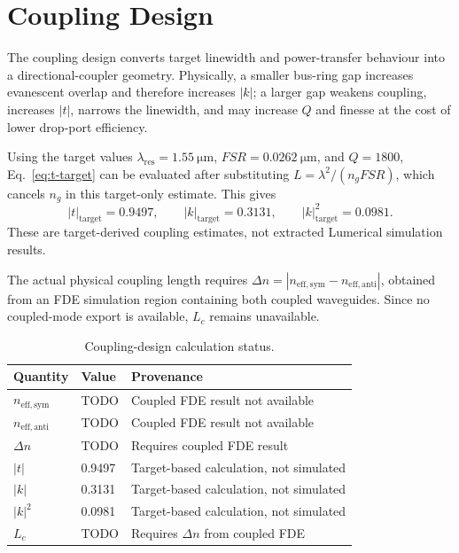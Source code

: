\section{Coupling Design}
The coupling design converts target linewidth and power-transfer behaviour into a directional-coupler geometry. Physically, a smaller bus-ring gap increases evanescent overlap and therefore increases \(|k|\); a larger gap weakens coupling, increases \(|t|\), narrows the linewidth, and may increase \(Q\) and finesse at the cost of lower drop-port efficiency.

Using the target values \(\lambda_{\mathrm{res}}=\SI{1.55}{\micro\metre}\), \(FSR=\SI{0.0262}{\micro\metre}\), and \(Q=1800\), Eq.~\eqref{eq:t-target} can be evaluated after substituting \(L=\lambda^2/(n_g FSR)\), which cancels \(n_g\) in this target-only estimate. This gives
\begin{equation}
|t|_{\mathrm{target}} = 0.9497,\qquad
|k|_{\mathrm{target}} = 0.3131,\qquad
|k|_{\mathrm{target}}^2 = 0.0981.
\end{equation}
These are target-derived coupling estimates, not extracted Lumerical simulation results.

The actual physical coupling length requires
\(\Delta n = |n_{\mathrm{eff,sym}} - n_{\mathrm{eff,anti}}|\), obtained from an FDE simulation region containing both coupled waveguides. Since no coupled-mode export is available, \(L_c\) remains unavailable.

\begin{table}[H]
\centering
\caption{Coupling-design calculation status.}
\label{tab:coupling-results}
\begin{tabular}{lll}
\toprule
Quantity & Value & Provenance \\
\midrule
\(n_{\mathrm{eff,sym}}\) & TODO & Coupled FDE result not available \\
\(n_{\mathrm{eff,anti}}\) & TODO & Coupled FDE result not available \\
\(\Delta n\) & TODO & Requires coupled FDE result \\
\(|t|\) & 0.9497 & Target-based calculation, not simulated \\
\(|k|\) & 0.3131 & Target-based calculation, not simulated \\
\(|k|^2\) & 0.0981 & Target-based calculation, not simulated \\
\(L_c\) & TODO & Requires \(\Delta n\) from coupled FDE \\
\bottomrule
\end{tabular}
\end{table}
